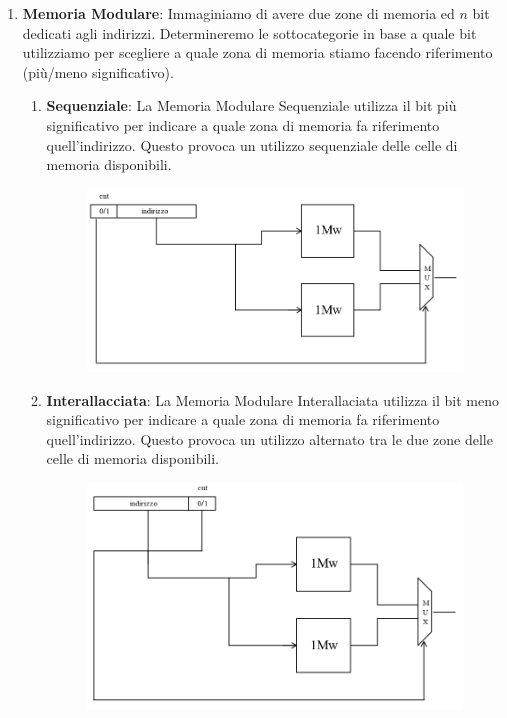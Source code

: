 \documentclass{article}
\begin{document}
\begin{enumerate}
    \item \textbf{Memoria Modulare}: Immaginiamo di avere due zone di memoria ed $n$ bit dedicati agli indirizzi. Determineremo le sottocategorie in base a quale bit utilizziamo per scegliere a quale zona di memoria stiamo facendo riferimento (più/meno significativo).

    \begin{enumerate}
        \item \textbf{Sequenziale}: La Memoria Modulare Sequenziale utilizza il bit più significativo per indicare a quale zona di memoria fa riferimento quell'indirizzo. Questo provoca un utilizzo sequenziale delle celle di memoria disponibili.

    \begin{figure}[htbp]
        \includegraphics[scale=0.32]{img/memoriaModulare1.png}
        \centering
    \end{figure}
    \vspace*{-5px}
        \item \textbf{Interallacciata}: La Memoria Modulare Interallaciata utilizza il bit meno significativo per indicare a quale zona di memoria fa riferimento quell'indirizzo. Questo provoca un utilizzo alternato tra le due zone delle celle di memoria disponibili.

    \begin{figure}[htbp]
        \includegraphics[scale=0.32]{img/memoriaModulare2.png}
        \centering
    \end{figure}

    \end{enumerate}
        
\end{enumerate}
\end{document}
